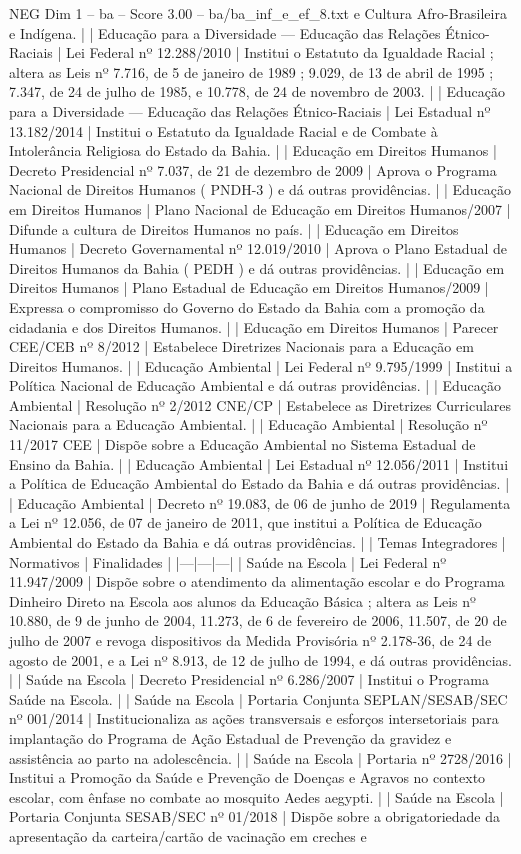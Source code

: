 \begin{textsample}{NEG Dim 1 – ba – Score 3.00 – ba/ba\_inf\_e\_ef\_8.txt}
e Cultura Afro-Brasileira e Indígena. | | Educação para a Diversidade — Educação das Relações Étnico-Raciais | Lei Federal nº 12.288/2010 | Institui o Estatuto da Igualdade Racial ; altera as Leis nº 7.716, de 5 de janeiro de 1989 ; 9.029, de 13 de abril de 1995 ; 7.347, de 24 de julho de 1985, e 10.778, de 24 de novembro de 2003. | | Educação para a Diversidade — Educação das Relações Étnico-Raciais | Lei Estadual nº 13.182/2014 | Institui o Estatuto da Igualdade Racial e de Combate à Intolerância Religiosa do Estado da Bahia. | | Educação em Direitos Humanos | Decreto Presidencial nº 7.037, de 21 de dezembro de 2009 | Aprova o Programa Nacional de Direitos Humanos ( PNDH-3 ) e dá outras providências. | | Educação em Direitos Humanos | Plano Nacional de Educação em Direitos Humanos/2007 | Difunde a cultura de Direitos Humanos no país. | | Educação em Direitos Humanos | Decreto Governamental nº 12.019/2010 | Aprova o Plano Estadual de Direitos Humanos da Bahia ( PEDH ) e dá outras providências. | | Educação em Direitos Humanos | Plano Estadual de Educação em Direitos Humanos/2009 | Expressa o compromisso do Governo do Estado da Bahia com a promoção da cidadania e dos Direitos Humanos. | | Educação em Direitos Humanos | Parecer CEE/CEB nº 8/2012 | Estabelece Diretrizes Nacionais para a Educação em Direitos Humanos. | | Educação Ambiental | Lei Federal nº 9.795/1999 | Institui a Política Nacional de Educação Ambiental e dá outras providências. | | Educação Ambiental | Resolução nº 2/2012 CNE/CP | Estabelece as Diretrizes Curriculares Nacionais para a Educação Ambiental. | | Educação Ambiental | Resolução nº 11/2017 CEE | Dispõe sobre a Educação Ambiental no Sistema Estadual de Ensino da Bahia. | | Educação Ambiental | Lei Estadual nº 12.056/2011 | Institui a Política de Educação Ambiental do Estado da Bahia e dá outras providências. | | Educação Ambiental | Decreto nº 19.083, de 06 de junho de 2019 | Regulamenta a Lei nº 12.056, de 07 de janeiro de 2011, que institui a Política de Educação Ambiental do Estado da Bahia e dá outras providências. | | Temas Integradores | Normativos | Finalidades | |---|---|---| | Saúde na Escola | Lei Federal nº 11.947/2009 | Dispõe sobre o atendimento da alimentação escolar e do Programa Dinheiro Direto na Escola aos alunos da Educação Básica ; altera as Leis nº 10.880, de 9 de junho de 2004, 11.273, de 6 de fevereiro de 2006, 11.507, de 20 de julho de 2007 e revoga dispositivos da Medida Provisória nº 2.178-36, de 24 de agosto de 2001, e a Lei nº 8.913, de 12 de julho de 1994, e dá outras providências. | | Saúde na Escola | Decreto Presidencial nº 6.286/2007 | Institui o Programa Saúde na Escola. | | Saúde na Escola | Portaria Conjunta SEPLAN/SESAB/SEC nº 001/2014 | Institucionaliza as ações transversais e esforços intersetoriais para implantação do Programa de Ação Estadual de Prevenção da gravidez e assistência ao parto na adolescência. | | Saúde na Escola | Portaria nº 2728/2016 | Institui a Promoção da Saúde e Prevenção de Doenças e Agravos no contexto escolar, com ênfase no combate ao mosquito Aedes aegypti. | | Saúde na Escola | Portaria Conjunta SESAB/SEC nº 01/2018 | Dispõe sobre a obrigatoriedade da apresentação da carteira/cartão de vacinação em creches e 
\end{textsample}
